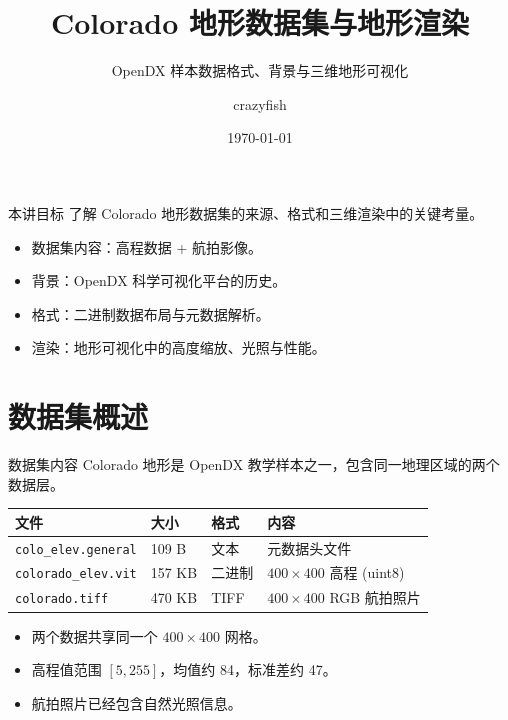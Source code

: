 \documentclass[aspectratio=169,11pt]{ctexbeamer}
\title{Colorado 地形数据集与地形渲染}
\subtitle{OpenDX 样本数据格式、背景与三维地形可视化}
\author{crazyfish}
\date{\today}
\begin{document}
\begin{frame}
  \titlepage
\end{frame}

\begin{frame}{本讲目标}
  了解 Colorado 地形数据集的来源、格式和三维渲染中的关键考量。

  \begin{itemize}
    \item 数据集内容：高程数据 + 航拍影像。
    \item 背景：OpenDX 科学可视化平台的历史。
    \item 格式：二进制数据布局与元数据解析。
    \item 渲染：地形可视化中的高度缩放、光照与性能。
  \end{itemize}
\end{frame}

\section{数据集概述}

\begin{frame}{数据集内容}
  Colorado 地形是 OpenDX 教学样本之一，包含同一地理区域的两个数据层。

  \begin{table}
    \centering
    \begin{tabularx}{0.9\linewidth}{lllX}
      \toprule
      文件 & 大小 & 格式 & 内容 \\
      \midrule
      \texttt{colo\_elev.general} & 109 B & 文本 & 元数据头文件 \\
      \texttt{colorado\_elev.vit} & 157 KB & 二进制 & $400\times400$ 高程 (uint8) \\
      \texttt{colorado.tiff} & 470 KB & TIFF & $400\times400$ RGB 航拍照片 \\
      \bottomrule
    \end{tabularx}
  \end{table}

  \begin{itemize}
    \item 两个数据共享同一个 $400\times400$ 网格。
    \item 高程值范围 $[5, 255]$，均值约 84，标准差约 47。
    \item 航拍照片已经包含自然光照信息。
  \end{itemize}
\end{frame}
\end{document}
